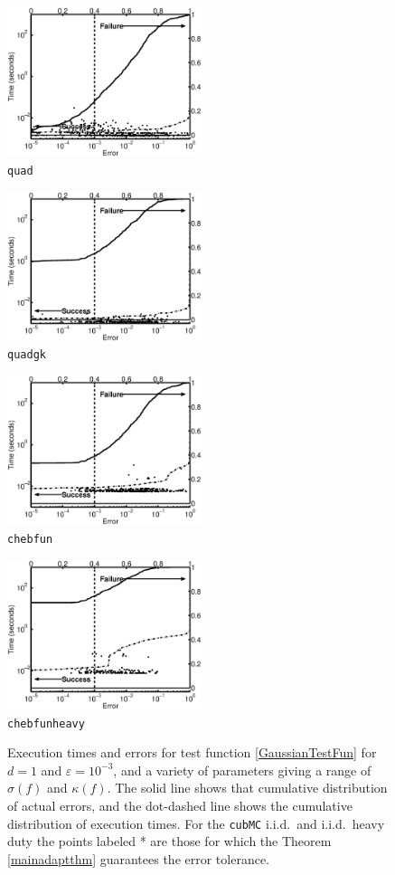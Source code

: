 \documentclass[graybox]{svmult}
\begin{document}
\begin{figure}
\begin{minipage}{5.7cm} \centering \includegraphics[width=5.7cm]{gaussiand=1quadErrTime.eps} \\ {\tt quad} \end{minipage}
\begin{minipage}{5.7cm} \centering \includegraphics[width=5.7cm]{gaussiand=1quadgkErrTime.eps} \\ {\tt quadgk} \end{minipage}
\begin{minipage}{5.7cm} \centering \includegraphics[width=5.7cm]{gaussiand=1chebfunErrTime.eps} \\ {\tt chebfun} \end{minipage}
\begin{minipage}{5.7cm} \centering \includegraphics[width=5.7cm]{gaussiand=1chebfunheavyErrTime.eps} \\ {\tt chebfunheavy} \end{minipage}
\caption{Execution times and errors for test function \eqref{GaussianTestFun} for $d=1$ and $\varepsilon=10^{-3}$, and a variety of parameters giving a range of $\sigma(f)$ and $\kappa(f)$. The solid line shows that cumulative distribution of actual errors, and the dot-dashed line shows the cumulative distribution of execution times.  For the {\tt cubMC} i.i.d.\ and i.i.d.\ heavy duty the points labeled * are those for which the Theorem \ref{mainadaptthm} guarantees the error tolerance.\label{GaussianTestFunFig} }
\end{figure}
\end{document}
